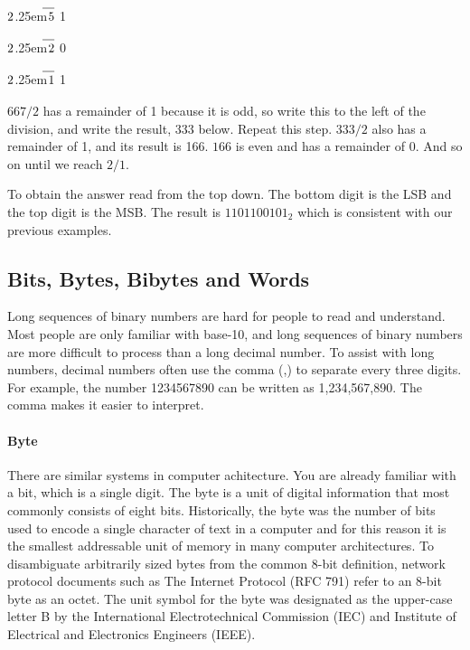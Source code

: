 \documentclass[11pt]{book}
\newcommand\Mydiv[2]{%
$\strut#1$\kern.25em\smash{\raise.3ex\hbox{$\big)$}}$\mkern-8mu
        \overline{\enspace\strut#2}$}
\begin{document}
 \Mydiv{2}{5} \hspace{1.2cm} 1
 
 \Mydiv{2}{2} \hspace{1.2cm} 0
 
 \Mydiv{2}{1} \hspace{1.2cm} 1
 
\vspace{1em}

$667/2$ has a remainder of 1 because it is odd, so write this to the left of the division, and write the result, $333$ below. Repeat this step. $333/2$ also has a remainder of 1, and its result is 166. $166$ is even and has a remainder of 0. And so on until we reach $2/1$.

To obtain the answer read from the top down. The bottom digit is the LSB and the top digit is the MSB. The result is $1101100101_2$ which is consistent with our previous examples.

\subsection{Bits, Bytes, Bibytes and Words\label{sec:data:bin:words}}
 
Long sequences of binary numbers are hard for people to read and understand. Most people are only familiar with base-10, and long sequences of binary numbers are more difficult to process than a long decimal number. To assist with long numbers, decimal numbers often use the comma (,) to separate every three digits. For example, the number 1234567890 can be written as 1,234,567,890. The comma makes it easier to interpret.

\paragraph{Byte} There are similar systems in computer achitecture. You are already familiar with a bit, which is a single digit. The byte is a unit of digital information that most commonly consists of eight bits. Historically, the byte was the number of bits used to encode a single character of text in a computer and for this reason it is the smallest addressable unit of memory in many computer architectures. To disambiguate arbitrarily sized bytes from the common 8-bit definition, network protocol documents such as The Internet Protocol (RFC 791) refer to an 8-bit byte as an octet. The unit symbol for the byte was designated as the upper-case letter B by the International Electrotechnical Commission (IEC) and Institute of Electrical and Electronics Engineers (IEEE).
\end{document}
